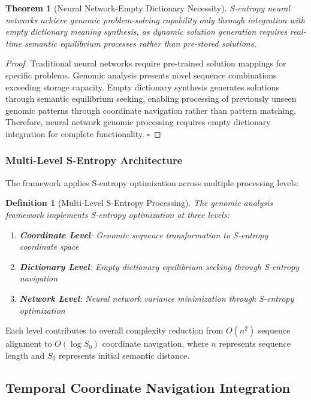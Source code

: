 \documentclass[12pt,a4paper]{article}
\newtheorem{theorem}{Theorem}
\newtheorem{definition}{Definition}
\begin{document}
\begin{theorem}[Neural Network-Empty Dictionary Necessity]
S-entropy neural networks achieve genomic problem-solving capability only through integration with empty dictionary meaning synthesis, as dynamic solution generation requires real-time semantic equilibrium processes rather than pre-stored solutions.
\end{theorem}

\begin{proof}
Traditional neural networks require pre-trained solution mappings for specific problems. Genomic analysis presents novel sequence combinations exceeding storage capacity. Empty dictionary synthesis generates solutions through semantic equilibrium seeking, enabling processing of previously unseen genomic patterns through coordinate navigation rather than pattern matching. Therefore, neural network genomic processing requires empty dictionary integration for complete functionality. $\square$
\end{proof}

\subsubsection{Multi-Level S-Entropy Architecture}

The framework applies S-entropy optimization across multiple processing levels:

\begin{definition}[Multi-Level S-Entropy Processing]
The genomic analysis framework implements S-entropy optimization at three levels:
\begin{enumerate}
\item \textbf{Coordinate Level}: Genomic sequence transformation to S-entropy coordinate space
\item \textbf{Dictionary Level}: Empty dictionary equilibrium seeking through S-entropy navigation  
\item \textbf{Network Level}: Neural network variance minimization through S-entropy optimization
\end{enumerate}
\end{definition}

Each level contributes to overall complexity reduction from $O(n^2)$ sequence alignment to $O(\log S_0)$ coordinate navigation, where $n$ represents sequence length and $S_0$ represents initial semantic distance.

\subsection{Temporal Coordinate Navigation Integration}
\end{document}
